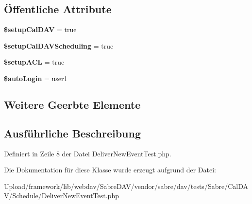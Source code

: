 \subsection*{Öffentliche Attribute}
\begin{DoxyCompactItemize}
\item 
\mbox{\label{class_sabre_1_1_cal_d_a_v_1_1_schedule_1_1_deliver_new_event_test_a86af9153c71a00027fd6f7cb10922e42}} 
{\bfseries \$setup\+Cal\+D\+AV} = true
\item 
\mbox{\label{class_sabre_1_1_cal_d_a_v_1_1_schedule_1_1_deliver_new_event_test_a0d8c8144ec7600698ab6da02a96503de}} 
{\bfseries \$setup\+Cal\+D\+A\+V\+Scheduling} = true
\item 
\mbox{\label{class_sabre_1_1_cal_d_a_v_1_1_schedule_1_1_deliver_new_event_test_ade7e0532b0a72b84203b9aa32774100e}} 
{\bfseries \$setup\+A\+CL} = true
\item 
\mbox{\label{class_sabre_1_1_cal_d_a_v_1_1_schedule_1_1_deliver_new_event_test_a09a942c6f54d56a2685ded6b9dcad37d}} 
{\bfseries \$auto\+Login} = \textquotesingle{}user1\textquotesingle{}
\end{DoxyCompactItemize}
\subsection*{Weitere Geerbte Elemente}


\subsection{Ausführliche Beschreibung}


Definiert in Zeile 8 der Datei Deliver\+New\+Event\+Test.\+php.



Die Dokumentation für diese Klasse wurde erzeugt aufgrund der Datei\+:\begin{DoxyCompactItemize}
\item 
Upload/framework/lib/webdav/\+Sabre\+D\+A\+V/vendor/sabre/dav/tests/\+Sabre/\+Cal\+D\+A\+V/\+Schedule/Deliver\+New\+Event\+Test.\+php\end{DoxyCompactItemize}
